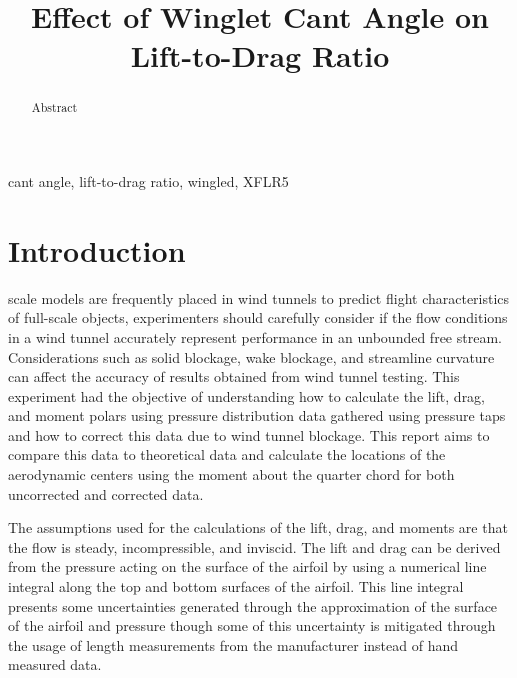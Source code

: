 \documentclass[journal,letterpaper]{IEEEtran}
\begin{document}
\title{Effect of Winglet Cant Angle on Lift-to-Drag Ratio}

\author{
}

\maketitle
\thispagestyle{empty}

\begin{abstract}
Abstract
\end{abstract}

\begin{IEEEkeywords}
cant angle, lift-to-drag ratio, wingled, XFLR5
\end{IEEEkeywords}


\section{Introduction}


 scale models are frequently placed in wind tunnels to predict flight characteristics of full-scale objects, experimenters should carefully consider if the flow conditions in a wind tunnel accurately represent performance in an unbounded free stream.
Considerations such as solid blockage, wake blockage, and streamline curvature can affect the accuracy of results obtained from wind tunnel testing.
This experiment had the objective of understanding how to calculate the lift, drag, and moment polars using pressure distribution data gathered using pressure taps and how to correct this data due to wind tunnel blockage.
This report aims to compare this data to theoretical data and calculate the locations of the aerodynamic centers using the moment about the quarter chord for both uncorrected and corrected data.

The assumptions used for the calculations of the lift, drag, and moments are that the flow is steady, incompressible, and inviscid.
The lift and drag can be derived from the pressure acting on the surface of the airfoil by using a numerical line integral along the top and bottom surfaces of the airfoil.
This line integral presents some uncertainties generated through the approximation of the surface of the airfoil and pressure though some of this uncertainty is mitigated through the usage of length measurements from the manufacturer instead of hand measured data.
\end{document}
